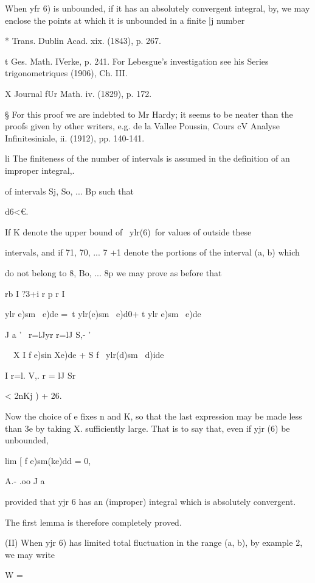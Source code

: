 When yfr 6) is unbounded, if it has an absolutely convergent integral,
by, we may enclose the points at which it is unbounded in a
finite |j number

* Trans. Dublin Acad. xix. (1843), p. 267.

t Ges. Math. IVerke, p. 241. For Lebesgue's investigation see his
Series trigonometriques (1906), Ch. III.

X Journal fUr Math. iv. (1829), p. 172.

§ For this proof we are indebted to Mr Hardy; it seems to be neater
than the proofs given by other writers, e.g. de la Vallee Poussin,
Cours cV Analyse Infinitesiniale, ii. (1912), pp. 140-141.

li The finiteness of the number of intervals is assumed in the
definition of an improper integral,.

%
%

of intervals Sj, So, ... Bp such that

d6<€.

If K denote the upper bound of \ ylr(6)\ for values of outside these

intervals, and if 71, 70, ... 7 +1 denote the portions of the interval
(a, b) which

do not belong to 8, Bo, ... 8p we may prove as before that

rb I ?3+i r p r I

ylr e)sm \ e)de =\ t ylr(e)sm \ e)d0+ t ylr e)sm \ e)de\

J a ' \ r=lJyr r=lJ S,- '

 \ \ X I f e)sin Xe)de + S f \ ylr(d)sm \ d)ide

I r=l. V,. r = lJ Sr

< 2nKj ) + 26.

Now the choice of e fixes n and K, so that the last expression may be
made less than 3e by taking X. sufficiently large. That is to say
that, even if yjr (6) be unbounded,

lim [ f e)sm(ke)dd = 0,

A.- .oo J a

provided that yjr 6 has an (improper) integral which is absolutely
convergent.

The first lemma is therefore completely proved.

(II) When yjr 6) has limited total fluctuation in the range (a, b), by example 2, we may write

 W = %

